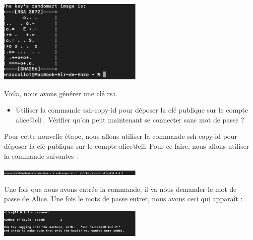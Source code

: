 \documentclass[12pt]{article}
\begin{document}
\vspace{0.3cm}

\begin{center}
  \includegraphics[width=7cm]{Image-TD-SSH-2/Génération-cle.png}
\end{center}

\vspace{0.3cm}

Voila, nous avons générer une clé rsa.

\vspace{0.3cm}

\begin{itemize}
  \item Utiliser la commande ssh-copy-id pour déposer la clé publique sur le compte alice@cli . Vérifier qu'on peut maintenant se connecter sans mot de passe ?
\end{itemize}

\vspace{0.3cm}

Pour cette nouvelle étape, nous allons utiliser la commande ssh-copy-id pour déposer la clé publique sur le compte alice@cli. Pour ce faire, nous allons utiliser la commande suivantes : 

\vspace{0.3cm}

\begin{center}
  \includegraphics[width=7cm]{Image-TD-SSH-2/ssh-copy-id.png}
\end{center}

\vspace{0.3cm}

Une fois que nous avons entrée la commande, il va nous demander le mot de passe de Alice. Une fois le mots de passe entrer, nous avons ceci qui apparaît : 

\vspace{0.3cm}

\begin{center}
  \includegraphics[width=7cm]{Image-TD-SSH-2/key-add.png}
\end{center}
\end{document}
